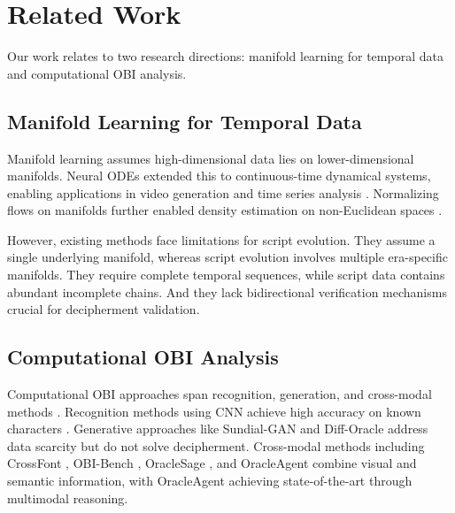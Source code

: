 \documentclass{article}
\begin{document}
\section{Related Work}
\label{sec:related_work}

Our work relates to two research directions: manifold learning for temporal data and computational OBI analysis.

\subsection{Manifold Learning for Temporal Data}

Manifold learning \cite{izenman2012introduction} assumes high-dimensional data lies on lower-dimensional manifolds. Neural ODEs \cite{bilovs2021neural, dupont2019augmented} extended this to continuous-time dynamical systems, enabling applications in video generation and time series analysis \cite{shnitzer2016manifold}. Normalizing flows on manifolds further enabled density estimation on non-Euclidean spaces \cite{kim2020softflow}.

However, existing methods face limitations for script evolution. They assume a single underlying manifold, whereas script evolution involves multiple era-specific manifolds. They require complete temporal sequences, while script data contains abundant incomplete chains. And they lack bidirectional verification mechanisms crucial for decipherment validation.

\subsection{Computational OBI Analysis}

Computational OBI approaches span recognition, generation, and cross-modal methods \cite{jin2023interactively, zhen2024oracle, gao2020distinguishing}. Recognition methods using CNN achieve high accuracy on known characters \cite{li2024research}. Generative approaches like Sundial-GAN \cite{chang2022sundial} and Diff-Oracle \cite{li2023diff} address data scarcity but do not solve decipherment. Cross-modal methods including CrossFont \cite{wu2025cross}, OBI-Bench \cite{chen2024obi}, OracleSage \cite{jiang2024oraclesage}, and OracleAgent \cite{li2025oracleagent} combine visual and semantic information, with OracleAgent achieving state-of-the-art through multimodal reasoning.

\end{document}
